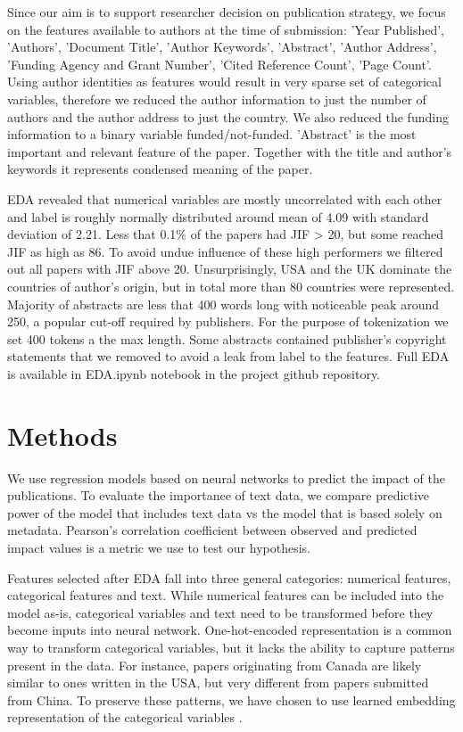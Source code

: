 \documentclass[11pt]{article}
\begin{document}
Since our aim is to support researcher decision on publication strategy, we focus on the features available to authors at the time of submission: 'Year Published', 'Authors', 'Document Title', 'Author Keywords', 'Abstract', 'Author Address', 'Funding Agency and Grant Number', 'Cited Reference Count', 'Page Count'. Using author identities as features would result in very sparse set of categorical variables, therefore we reduced the author information to just the number of authors and the author address to just the country. We also reduced the funding information to a binary variable funded/not-funded. 'Abstract' is the most important and relevant feature of the paper. Together with the title and author's keywords it represents condensed meaning of the paper.  
 
EDA revealed that numerical variables are mostly uncorrelated with each other and label is roughly normally distributed around mean of 4.09 with standard deviation of 2.21. Less that 0.1\% of the papers had JIF > 20, but some reached JIF as high as 86. To avoid undue influence of these high performers we filtered out all papers with JIF above 20. Unsurprisingly, USA and the UK dominate the countries of author's origin, but in total more than 80 countries were represented. Majority of abstracts are less that 400 words long with noticeable peak around 250, a popular cut-off required by publishers. For the purpose of tokenization we set 400 tokens a the max length. Some abstracts contained publisher's copyright statements that we removed to avoid a leak from label to the features. Full EDA is available in EDA.ipynb notebook in the project github repository. 

\section{Methods}
We use regression models based on neural networks to predict the impact of the publications. To evaluate the importance of text data, we compare predictive power of the model that includes text data vs the model that is based solely on metadata. Pearson's correlation coefficient between observed and predicted impact values is a metric we use to test our hypothesis. 

Features selected after EDA fall into three general categories: numerical features, categorical features and text. While numerical features can be included into the model as-is, categorical variables and text need to be transformed before they become inputs into neural network. One-hot-encoded representation is a common way to transform categorical variables, but it lacks the ability to capture patterns present in the data. For instance, papers originating from Canada are likely similar to ones written in the USA, but very different from papers submitted from China. To preserve these patterns, we have chosen to use learned embedding representation of the categorical variables \citep{DBLP:journals/corr/GuoB16}.
\end{document}
